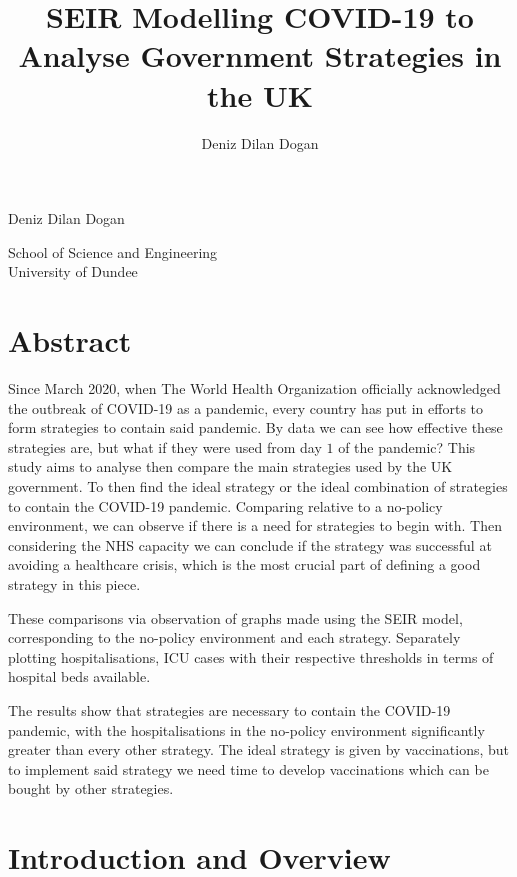 \documentclass[11pt]{article}
\title{SEIR Modelling COVID-19 to Analyse Government Strategies in the UK}
\author{Deniz Dilan Dogan}
\makeatletter
\renewcommand{\maketitle}{
\begin{center}

\pagestyle{empty}
\phantom{.}  %
\vspace{3cm}

{\Huge \bf \@title\par}
\vspace{2.5cm}

{\LARGE Deniz Dilan Dogan}\\[1cm]

{\Large\@date}

\vspace{4.5cm}

School of Science and Engineering\\
University of Dundee

\end{center}
}\makeatother
\makeatother
\begin{document}
	\maketitle

\newpage
	\tableofcontents
\pagebreak
\section{Abstract}
Since March 2020, when The World Health Organization officially acknowledged the outbreak of COVID-19 as a pandemic, every country has put in efforts to form strategies to contain said pandemic. By data we can see how effective these strategies are, but what if they were used from day $1$ of the pandemic? This study aims to analyse then compare the main strategies used by the UK government. To then find the ideal strategy or the ideal combination of strategies to contain the COVID-19 pandemic. Comparing relative to a no-policy environment, we can observe if there is a need for strategies to begin with. Then considering the NHS capacity we can conclude if the strategy was successful at avoiding a healthcare crisis, which is the most crucial part of defining a good strategy in this piece. \par
These comparisons via observation of graphs made using the SEIR model, corresponding to the no-policy environment and each strategy. Separately plotting hospitalisations, ICU cases with their respective thresholds in terms of hospital beds available. \par
The results show that strategies are necessary to contain the COVID-19 pandemic, with the hospitalisations in the no-policy environment significantly greater than every other strategy. The ideal strategy is given by vaccinations, but to implement said strategy we need time to develop vaccinations which can be bought by other strategies.

\section{Introduction and Overview}
\end{document}
